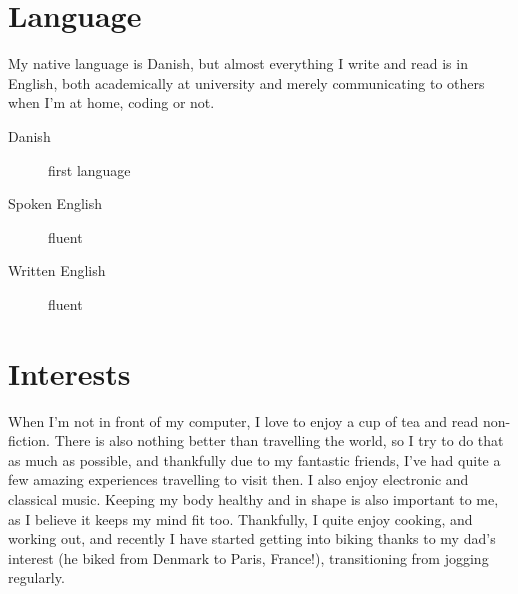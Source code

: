 \documentclass[margin,line]{resume}
\begin{document}
\begin{resume}
\section{\mysidestyle Language}
My native language is Danish, but almost everything I write and read is
in English, both academically at university and merely communicating to
others when I'm at home, coding or not.

\begin{description}
  \item[Danish] first language
  \item[Spoken English] fluent
  \item[Written English] fluent 
\end{description}

\section{\mysidestyle Interests}
When I'm not in front of my computer, I love to enjoy a cup of tea and read non-fiction. There is also nothing better than travelling the world, so I try to do that as much as possible, and thankfully due to my fantastic friends, I've had quite a few amazing experiences travelling to visit then. I also enjoy electronic and classical music. Keeping my body healthy and in shape is also important to me, as I believe it keeps my mind fit too. Thankfully, I quite enjoy cooking, and working out, and recently I have started getting into biking thanks to my dad's interest (he biked from Denmark to Paris, France!), transitioning from jogging regularly.
\end{resume}
\end{document}
